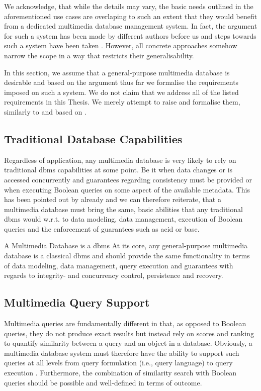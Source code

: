 We acknowledge, that while the details may vary, the basic needs outlined in the aforementioned use cases are overlaping to such an extent that they would benefit from a dedicated multimedia database management system. In fact, the argument for such a system has been made by different authors before us \cite{Adjeroh:1997Multimedia,Smeulders:2000Content,Zahalka:2014towards,Jonson:2016Ten,Khaleel:2021An} and steps towards such a system have been taken \cite{Giangreco:2018Database,Wang:2021Milvus}. However, all concrete approaches somehow narrow the scope in a way that restricts their generalisability.

In this section, we assume that a general-purpose multimedia database is desirable and based on the argument thus far we formalise the requirements imposed on such a system. We do not claim that we address all of the listed requirements in this Thesis. We merely attempt to raise and formalise them, similarly to and based on \cite{Adjeroh:1997Multimedia,Jonson:2016Ten,Khaleel:2021An}.

\subsection{Traditional Database Capabilities}
Regardless of application, any multimedia database is very likely to rely on traditional \acrshort{dbms} capabilities at some point. Be it when data changes or is accessed concurrently and guarantees regarding consistency must be provided or when executing Boolean queries on some aspect of the available metadata. This has been pointed out by \cite{Adjeroh:1997Multimedia,Khaleel:2021An} already and we can therefore reiterate, that a multimedia database must bring the same, basic abilities that any traditional \acrshort{dbms} would w.r.t. to data modeling, data management, execution of Boolean queries and the enforcement of guarantees such as \acrshort{acid} or \acrshort{base}.

\begin{requirement}[label=requirement:classical_dbms]{A Multimedia Database is a \acrshort{dbms}}{}
    At its core, any general-purpose multimedia database is a classical \acrlong{dbms} and should provide the same functionality in terms of data modeling, data management, query execution and guarantees with regards to integrity- and concurrency control, persistence and recovery.
\end{requirement}

\subsection{Multimedia Query Support}
Multimedia queries are fundamentally different in that, as opposed to Boolean queries, they do not produce exact results but instead rely on scores and ranking to quantify similarity between a query and an object in a database. Obviously, a multimedia database system must therefore have the ability to support such queries at all levels from query formulation (i.e., query language) to query execution \cite{Adjeroh:1997Multimedia}. Furthermore, the combination of similarity search with Boolean queries should be possible and well-defined in terms of outcome.

